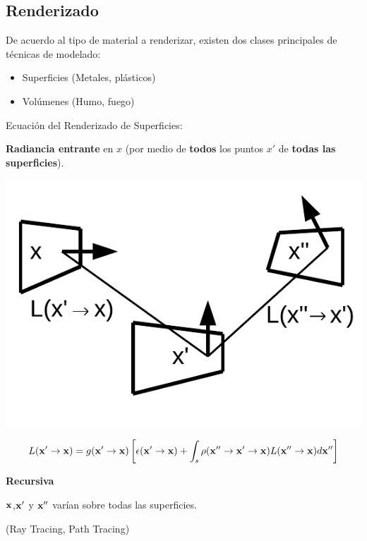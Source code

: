 \documentclass[spanish,unknownkeysallowed]{beamer}
\begin{document}
\subsection{Renderizado}

\begin{frame}
De acuerdo al tipo de material a renderizar, existen dos clases principales de técnicas de modelado:

\begin{block}{}
\begin{itemize}
\item Superficies (Metales, plásticos)
\item Volúmenes (Humo, fuego)
\end{itemize}
\end{block}
\end{frame}


\begin{frame}{Ecuación del Renderizado de Superficies:}

\textbf{Radiancia entrante} en $x$ (por medio de \textbf{todos} los puntos $x'$ de \textbf{todas las superficies}).

\centerline{\includegraphics[scale = 0.4]{../figures/rendequation}}
\vspace{-1cm}
$$ L(\bold{x'} \rightarrow \bold{x}) =  g(\bold{x'}  \rightarrow \bold{x})  \left[ \epsilon(\bold{x'}  \rightarrow \bold{x}) + \int_{s}{\rho(\bold{x''}  \rightarrow \bold{x'}  \rightarrow \bold{x})L(\bold{x''}  \rightarrow \bold{x}) d\bold{x''}} \right] $$

\textbf{Recursiva}

$\bold{x}$,$\bold{x'}$ y $\bold{x''}$ varían sobre todas las superficies.

(Ray Tracing, Path Tracing)

\end{frame}
\end{document}
